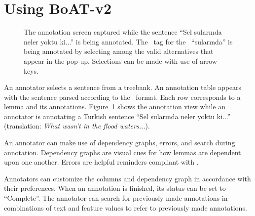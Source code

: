 \section{Using BoAT-v2}
\label{sec:annotation}


\begin{figure}[th!]
    \centering
    \caption{The annotation screen captured while the sentence ``Sel sularında neler yoktu ki...'' is being annotated. The \deprel\ tag for the \form\ ``sularında'' is being annotated by selecting among the valid alternatives that appear in the pop-up. Selections can be made with use of arrow keys.}
    \label{fig:anno-fig}
\end{figure}


An annotator selects a sentence from a treebank.
An annotation table appears with the sentence parsed according to the \ud\ format.
Each row corresponds to a lemma and its annotations.
Figure~\ref{fig:anno-fig} shows the annotation view while an annotator is annotating a Turkish sentence ``Sel sularında neler yoktu ki...'' (translation: \textit{What wasn't in the flood waters...}).

An annotator can make use of dependency graphs, errors, and search during annotation.
Dependency graphs are visual cues for how lemmas are dependent upon one another.
Errors are helpful reminders compliant with \ud.

Annotators can customize the columns and dependency graph in accordance with their preferences.
When an annotation is finished, its status can be set to ``Complete''.
The annotator can search for previously made annotations in combinations of text and feature values to refer to previously made annotations.
